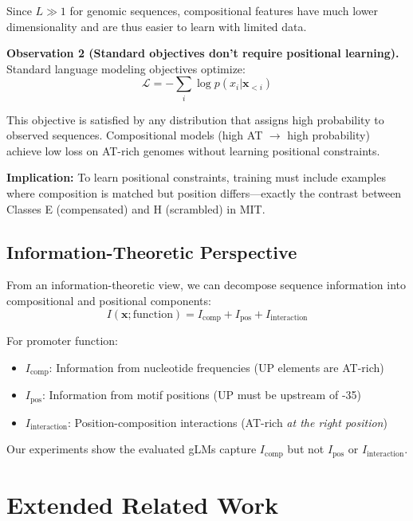 \documentclass{article}
\begin{document}
Since $L \gg 1$ for genomic sequences, compositional features have much lower dimensionality and are thus easier to learn with limited data.

\textbf{Observation 2 (Standard objectives don't require positional learning).} Standard language modeling objectives optimize:
\begin{equation}
\mathcal{L} = -\sum_{i} \log p(x_i | \mathbf{x}_{<i})
\end{equation}

This objective is satisfied by any distribution that assigns high probability to observed sequences. Compositional models (high AT $\rightarrow$ high probability) achieve low loss on AT-rich genomes without learning positional constraints.

\textbf{Implication:} To learn positional constraints, training must include examples where composition is matched but position differs---exactly the contrast between Classes E (compensated) and H (scrambled) in MIT.

\subsection{Information-Theoretic Perspective}

From an information-theoretic view, we can decompose sequence information into compositional and positional components:
\begin{equation}
I(\mathbf{x}; \text{function}) = I_{\text{comp}} + I_{\text{pos}} + I_{\text{interaction}}
\end{equation}

For promoter function:
\begin{itemize}
\item $I_{\text{comp}}$: Information from nucleotide frequencies (UP elements are AT-rich)
\item $I_{\text{pos}}$: Information from motif positions (UP must be upstream of -35)
\item $I_{\text{interaction}}$: Position-composition interactions (AT-rich \textit{at the right position})
\end{itemize}

Our experiments show the evaluated gLMs capture $I_{\text{comp}}$ but not $I_{\text{pos}}$ or $I_{\text{interaction}}$.

\section{Extended Related Work}
\label{app:related}
\end{document}
